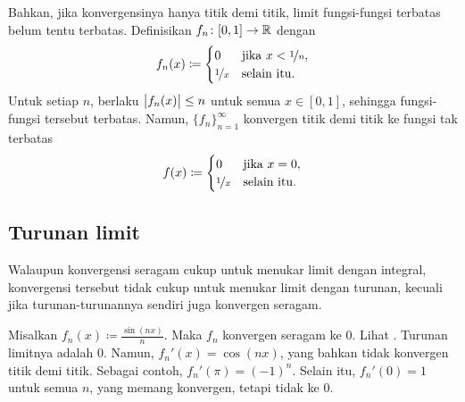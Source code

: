 \begin{example}
Bahkan, jika konvergensinya hanya titik demi titik, limit fungsi-fungsi
terbatas belum tentu terbatas.
Definisikan $f_n \colon [0,1] \to {\mathbb{R}}$ dengan
\begin{equation*}
f_n(x) \coloneqq
\begin{cases}
0 & \text{jika } x < \nicefrac{1}{n},\\
\nicefrac{1}{x} & \text{selain itu.}
\end{cases}
\end{equation*}
Untuk setiap $n$, berlaku $\bigl\lvert {f_n(x)} \bigr\rvert \leq n$ untuk semua $x \in [0,1]$, sehingga
fungsi-fungsi tersebut terbatas.  Namun, $\{ f_n \}_{n=1}^\infty$ konvergen titik demi titik ke
fungsi tak terbatas
\begin{equation*}
f(x) \coloneqq
\begin{cases}
0 & \text{jika } x = 0,\\
\nicefrac{1}{x} & \text{selain itu.}
\end{cases}
\end{equation*}
\end{example}

\subsection{Turunan limit}

Walaupun konvergensi seragam cukup untuk menukar limit dengan integral, konvergensi tersebut tidak
cukup untuk menukar limit dengan turunan, kecuali jika turunan-turunannya sendiri juga
konvergen seragam.

\begin{example}
Misalkan $f_n(x) \coloneqq \frac{\sin(nx)}{n}$.  Maka $f_n$ konvergen seragam ke
0.  Lihat .
Turunan limitnya adalah 0.  Namun, $f_n'(x) = \cos(nx)$, yang
bahkan tidak konvergen titik demi titik.
Sebagai contoh, $f_n'(\pi) = {(-1)}^n$.
Selain itu, $f_n'(0) = 1$ untuk semua $n$, yang memang konvergen, tetapi tidak ke $0$.
\begin{myfigureht}
\caption{Grafik $\frac{\sin(nx)}{n}$ untuk
$n=1,2,\ldots,10$, dengan $n$ yang lebih besar digambar dalam warna abu-abu yang lebih muda.%
\label{fig:conv1nsinxn}}
\end{myfigureht}
\end{example}

